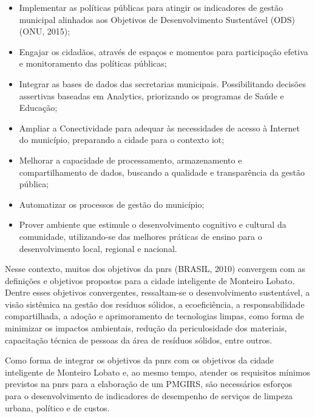 	\begin{itemize}
		\item Implementar as políticas públicas para atingir os indicadores de gestão municipal alinhados aos Objetivos de Desenvolvimento Sustentável (ODS) (ONU, 2015);
	
		\item Engajar os cidadãos, através de espaços e momentos para participação efetiva e monitoramento das políticas públicas;
	
		\item Integrar as bases de dados das secretarias municipais. Possibilitando decisões assertivas baseadas em Analytics, priorizando os programas de Saúde e Educação;
	
		\item Ampliar a Conectividade para adequar às necessidades de acesso à Internet do município, preparando a cidade para o contexto \gls{iot};
	
		\item Melhorar a capacidade de processamento, armazenamento e compartilhamento de dados, buscando a qualidade e transparência da gestão pública;
	
		\item Automatizar os processos de gestão do município;
	
		\item Prover ambiente que estimule o desenvolvimento cognitivo e cultural da comunidade, utilizando-se das melhores práticas de ensino para o desenvolvimento local, regional e nacional.
	\end{itemize}
	
	Nesse contexto, muitos dos objetivos da \gls{pnrs} (BRASIL, 2010) convergem com as definições e objetivos propostos para a cidade inteligente de Monteiro Lobato. Dentre esses objetivos convergentes, ressaltam-se o desenvolvimento sustentável, a visão sistêmica na gestão dos resíduos sólidos, a ecoeficiência, a responsabilidade compartilhada, a adoção e aprimoramento de tecnologias limpas, como forma de minimizar os impactos ambientais, redução da periculosidade dos materiais, capacitação técnica de pessoas da área de resíduos sólidos, entre outros. 
	
	Como forma de integrar os objetivos da \gls{pnrs} com os objetivos da cidade inteligente de Monteiro Lobato e, ao mesmo tempo, atender os requisitos mínimos previstos na \gls{pnrs} para a elaboração de um PMGIRS, são necessários esforços para o desenvolvimento de indicadores de desempenho de serviços de limpeza urbana, político e de custos. 
	
